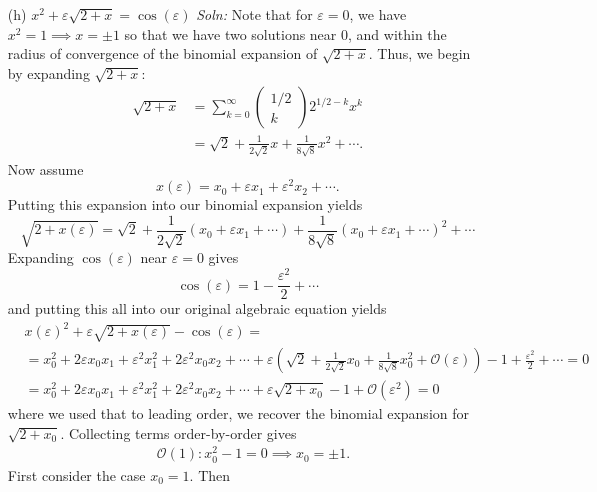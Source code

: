 \documentclass{article}
\begin{document}
\begin{itemize}
\begin{itemize}
        
        \item[(h)] $x^2 + \varepsilon\sqrt{2 + x} = \cos(\varepsilon)$
        \newline\newline
        \textit{Soln:} Note that for $\varepsilon = 0$, we have $x^2 = 1 \implies x = \pm 1$ so that we have two solutions near 0, and within the radius of convergence of the binomial expansion of $\sqrt{2 + x}$. Thus, we begin by expanding $\sqrt{2 + x}:$
        \begin{align*}
            \sqrt{2 + x} &= \sum_{k = 0}^{\infty} \begin{pmatrix}
                1/2\\
                k
            \end{pmatrix}2^{1/2-k}x^k\\
            &= \sqrt{2} + \frac{1}{2\sqrt{2}}x + \frac{1}{8\sqrt{8}}x^2 + \cdots.
        \end{align*}
        Now assume
        \[x(\varepsilon) = x_0 + \varepsilon x_1 + \varepsilon^2x_2 + \cdots.\]
        Putting this expansion into our binomial expansion yields
        \[\sqrt{2 + x(\varepsilon)} = \sqrt{2} + \frac{1}{2\sqrt{2}}(x_0 + \varepsilon x_1 + \cdots) + \frac{1}{8\sqrt{8}}(x_0 + \varepsilon x_1 + \cdots)^2 + \cdots\]
        Expanding $\cos(\varepsilon)$ near $\varepsilon = 0$ gives
        \[\cos(\varepsilon) = 1 - \frac{\varepsilon^2}{2} + \cdots\]
        and putting this all into our original algebraic equation yields
        \begin{align*}
            &x(\varepsilon)^2 + \varepsilon\sqrt{2 + x(\varepsilon)} - \cos(\varepsilon) = \\
            &=x_0^2 + 2\varepsilon x_0x_1 + \varepsilon^2 x_1^2 + 2\varepsilon^2x_0x_2 + \cdots + \varepsilon\left(\sqrt{2} + \frac{1}{2\sqrt{2}}x_0 + \frac{1}{8\sqrt{8}}x_0^2 + \mathcal{O}(\varepsilon)\right) - 1 + \frac{\varepsilon^2}{2} + \cdots = 0\\
            &= x_0^2 + 2\varepsilon x_0x_1 + \varepsilon^2 x_1^2 + 2\varepsilon^2 x_0x_2 + \cdots + \varepsilon\sqrt{2 + x_0} - 1 + \mathcal{O}(\varepsilon^2) = 0
        \end{align*}
        where we used that to leading order, we recover the binomial expansion for $\sqrt{2 + x_0}$. Collecting terms order-by-order gives
        \begin{align*}
            &\mathcal{O}(1): x_0^2 - 1 = 0 \implies x_0 = \pm 1.
        \end{align*}
        First consider the case $x_0 = 1$. Then

\end{itemize}
\end{itemize}
\end{document}
